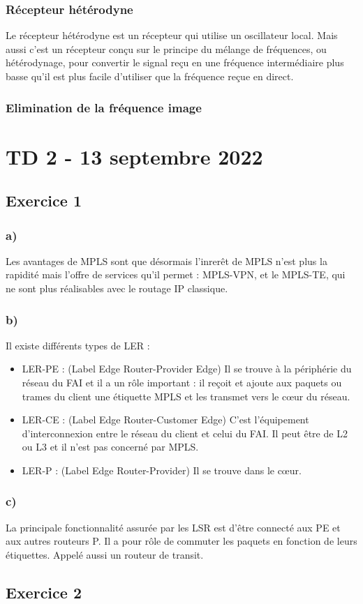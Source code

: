 \documentclass[12pt, a4paper]{article}
\begin{document}
    \subsubsection{Récepteur hétérodyne}
    Le récepteur hétérodyne est un récepteur qui utilise un oscillateur local. 
    Mais aussi c'est un récepteur conçu sur le principe du mélange de 
    fréquences, ou hétérodynage, pour convertir le signal reçu en une 
    fréquence intermédiaire plus basse qu'il est plus facile d'utiliser 
    que la fréquence reçue en direct.


    \subsubsection{Elimination de la fréquence image}


\newpage
\section{TD 2 - 13 septembre 2022}
\subsection{Exercice 1}
    \subsubsection{a)}
    Les avantages de MPLS sont que désormais l'inrerêt de MPLS n'est plus la 
    rapidité mais l'offre de services qu'il permet : MPLS-VPN, et le MPLS-TE, 
    qui ne sont plus réalisables avec le routage IP classique.\\

    \subsubsection{b)}
    Il existe différents types de LER : 
    \begin{itemize}
        \item LER-PE : (Label Edge Router-Provider Edge) Il se trouve à la 
        périphérie du réseau du FAI et il a un rôle important : il reçoit et 
        ajoute aux paquets ou trames du client une étiquette MPLS et les 
        transmet vers le cœur du réseau.\\
        \item LER-CE : (Label Edge Router-Customer Edge) C’est l’équipement 
        d’interconnexion entre le réseau du client et celui du FAI. Il peut 
        être de L2 ou L3 et il n’est pas concerné par MPLS.\\
        \item LER-P : (Label Edge Router-Provider) Il se trouve dans le cœur. 
    \end{itemize}

    \subsubsection{c)}
    La principale fonctionnalité assurée par les LSR est d'être connecté aux 
    PE et aux autres routeurs P. Il a pour rôle de commuter les paquets en 
    fonction de leurs étiquettes. Appelé aussi un routeur de transit.

\subsection{Exercice 2}
    
\end{document}
